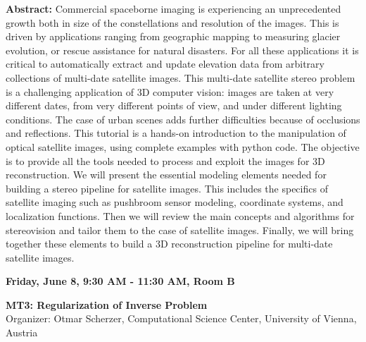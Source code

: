 \textbf{Abstract:} 
Commercial spaceborne imaging is experiencing an unprecedented growth both in size of the constellations and resolution of the images. This is driven by applications ranging from geographic mapping to measuring glacier evolution, or rescue assistance for natural disasters. For all these applications it is critical to automatically extract and update elevation data from arbitrary collections of multi-date satellite images. This multi-date satellite stereo problem is a challenging application of 3D computer vision: images are taken at very different dates, from very different points of view, and under different lighting conditions. The case of urban scenes adds further difficulties because of occlusions and reflections.
This tutorial is a hands-on introduction to the manipulation of optical satellite images, using complete examples with python code. The objective is to provide all the tools needed to process and exploit the images for 3D reconstruction. We will present the essential modeling elements needed for building a stereo pipeline for satellite images. This includes the specifics of satellite imaging such as pushbroom sensor modeling, coordinate systems, and localization functions. Then we will review the main concepts and algorithms for stereovision and tailor them to the case of satellite images. Finally, we will bring together these elements to build a 3D reconstruction pipeline for multi-date satellite images.
\newpage
\begin{center}\textbf{Friday, June 8, 9:30 AM - 11:30 AM, Room B}\end{center}
\begin{center}
\textbf{MT3: Regularization of Inverse Problem}\\
Organizer: Otmar Scherzer, Computational Science Center, University of Vienna, Austria
\end{center}

